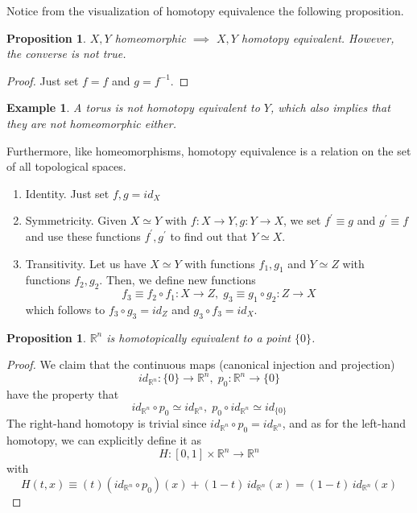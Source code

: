 \documentclass{article}
\newtheorem{proposition}[theorem]{Proposition}
\newtheorem{example}{Example}[section]
\theoremstyle{remark}
\theoremstyle{definition}
\begin{document}
Notice from the visualization of homotopy equivalence the following proposition. 

\begin{proposition}
$X, Y$ homeomorphic $\implies$ $X, Y$ homotopy equivalent. However, the converse is not true. 
\end{proposition}
\begin{proof}
Just set $f = f$ and $g = f^{-1}$. 
\end{proof}

\begin{example}
A torus is not homotopy equivalent to $Y$, which also implies that they are not homeomorphic either. 
\begin{center}
\end{center}
\end{example}

Furthermore, like homeomorphisms, homotopy equivalence is a relation on the set of all topological spaces. 
\begin{enumerate}
    \item Identity. Just set $f, g = id_X$
    \item Symmetricity. Given $X \simeq Y$ with $f: X \longrightarrow Y, g: Y \longrightarrow X$, we set $f^\prime \equiv g$ and $g^\prime \equiv f$ and use these functions $f^\prime, g^\prime$ to find out that $Y \simeq X$. 
    \item Transitivity. Let us have $X \simeq Y$ with functions $f_1, g_1$ and $Y \simeq Z$ with functions $f_2, g_2$. Then, we define new functions 
    \[f_3 \equiv f_2 \circ f_1: X \longrightarrow Z, \; g_3 \equiv g_1 \circ g_2: Z \longrightarrow X\]
    which follows to $f_3 \circ g_3 = id_Z$ and $g_3 \circ f_3 = id_X$. 
\end{enumerate}

\begin{proposition}
$\mathbb{R}^n$ is homotopically equivalent to a point $\{0\}$.
\end{proposition}
\begin{proof}
We claim that the continuous maps (canonical injection and projection)
\[id_{\mathbb{R}^n}: \{0\} \longrightarrow \mathbb{R}^n , \; p_0 : \mathbb{R}^n \longrightarrow \{0\}\]
have the property that 
\[id_{\mathbb{R}^n} \circ p_0 \simeq id_{\mathbb{R}^n} , \; p_0 \circ id_{\mathbb{R}^n} \simeq id_{\{0\}}\]
The right-hand homotopy is trivial since $id_{\mathbb{R}^n} \circ p_0 = id_{\mathbb{R}^n}$, and as for the left-hand homotopy, we can explicitly define it as
\[H: [0,1] \times \mathbb{R}^n \longrightarrow \mathbb{R}^n\]
with
\[H(t, x) \equiv (t) (id_{\mathbb{R}^n} \circ p_0 )(x) + (1-t) \, id_{\mathbb{R}^n} (x) = (1-t)\, id_{\mathbb{R}^n} (x)\]
\end{proof}
\end{document}
